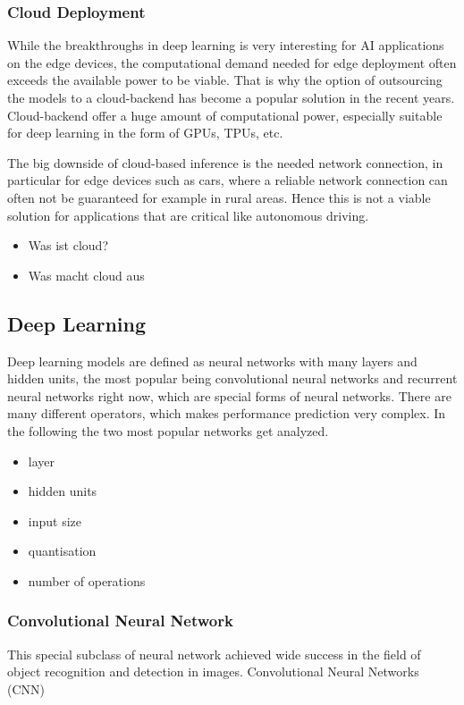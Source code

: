 \subsubsection{Cloud Deployment}
While the breakthroughs in deep learning is very interesting for AI applications on the edge devices, the computational demand needed for edge deployment often exceeds the available power to be viable.
That is why the option of outsourcing the models to a cloud-backend has become a popular solution in the recent years.
Cloud-backend offer a huge amount of computational power, especially suitable for deep learning in the form of GPUs, TPUs, etc.


The big downside of cloud-based inference is the needed network connection, in particular for edge devices such as cars, where a reliable network connection can often not be guaranteed for example in rural areas. Hence this is not a viable solution for applications that are critical like autonomous driving.
\begin{itemize}
    \item Was ist cloud?
    \item Was macht cloud aus
\end{itemize}

\subsection{Deep Learning}
Deep learning models are defined as neural networks with many layers and hidden units, the most popular being convolutional neural networks and recurrent neural networks right now, which are special forms of neural networks.
There are many different operators, which makes performance prediction very complex.
In the following the two most popular networks get analyzed.

\begin{itemize}
    \item layer
    \item hidden units
    \item input size
    \item quantisation
    \item number of operations
\end{itemize}
\subsubsection{Convolutional Neural Network}
This special subclass of neural network achieved wide success in the field of object recognition and detection in images. Convolutional Neural Networks (CNN)
